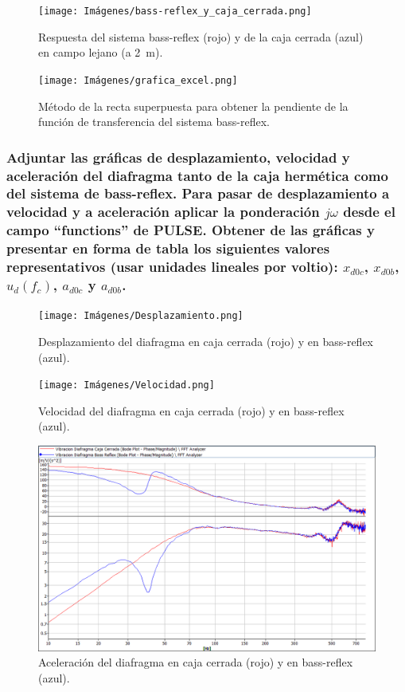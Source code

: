 \documentclass[10pt]{article}
\begin{document}
\begin{figure}[hbtp]
  \centering
  \texttt{[image: Imágenes/bass-reflex\_y\_caja\_cerrada.png]}
  \caption{Respuesta del sistema bass-reflex (rojo) y de la caja cerrada (azul) en campo lejano (a \qty{2}{\metre }).}
  \label{fig:bass-reflex_y_caja_cerrada.png}
\end{figure}

\begin{figure}[hbtp]
  \centering
  \texttt{[image: Imágenes/grafica\_excel.png]}
  \caption{Método de la recta superpuesta para obtener la pendiente de la función de transferencia del sistema bass-reflex.}
  \label{fig:grafica_excel.png}
\end{figure}

\subsubsection{Adjuntar las gráficas de desplazamiento, velocidad y aceleración del diafragma tanto de la caja hermética como del sistema de bass-reflex. Para pasar de desplazamiento a velocidad y a aceleración aplicar la ponderación $j \omega$ desde el campo ``functions'' de PULSE. Obtener de las gráficas y presentar en forma de tabla los siguientes valores representativos (usar unidades lineales por voltio): $x_{d0c}$, $x_{d0b}$, $u_d (f_c)$, $a_{d0c}$ y $a_{d0b}$.}

\begin{figure}[htp]
  \centering
  \texttt{[image: Imágenes/Desplazamiento.png]}
  \caption{Desplazamiento del diafragma en caja cerrada (rojo) y en bass-reflex (azul).}
  \label{fig:Desplazamiento.png}
\end{figure}
\begin{figure}[htp]
  \centering
  \texttt{[image: Imágenes/Velocidad.png]}
  \caption{Velocidad del diafragma en caja cerrada (rojo) y en bass-reflex (azul).}
  \label{fig:Velocidad.png}
\end{figure}
\begin{figure}[htp]
  \centering
  \includegraphics[width=0.8\linewidth]{Imágenes/Aceleración.png}
  \caption{Aceleración del diafragma en caja cerrada (rojo) y en bass-reflex (azul).}
  \label{fig:Aceleracion.png}
\end{figure}
\end{document}
